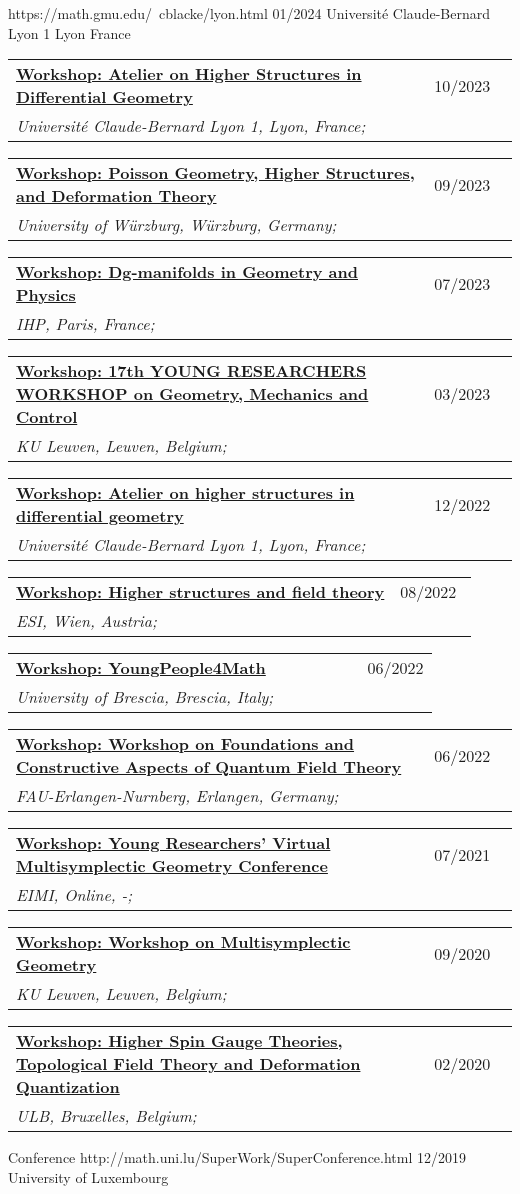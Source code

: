 \documentclass[a4paper]{article}
\newcommand{\longvoice}[8]{
	\begin{tabular}{p{0.83\linewidth} p{0.17\linewidth} }
		\textbf{\href{#3}{#2: #1}} & #4 
		\\ 
		\textit{#5, #6, #7;} & {\small\emph{#8}}
	\end{tabular}
	\vspace{.5em}
}
\begin{document}
		{https://math.gmu.edu/~cblacke/lyon.html}
		{01/2024}
		{Université Claude-Bernard Lyon 1}
		{Lyon}
		{France}
		{}
	\longvoice{Atelier on Higher Structures in Differential Geometry}
		{Workshop}
		{https://ryvkin.eu/hs2023/index.html}
		{10/2023}
		{Université Claude-Bernard Lyon 1}
		{Lyon}
		{France}
		{}
	\longvoice{Poisson Geometry, Higher Structures, and Deformation Theory}
		{Workshop}
		{https://www.mathematik.uni-wuerzburg.de/mathematicalphysics/forschung/veranstaltungen/workshops-und-konferenzen/single/news/poisson-geometry-higher-structures-and-deformation-theory/}
		{09/2023}
		{University of Würzburg}
		{Würzburg}
		{Germany}
		{}
	\longvoice{Dg-manifolds in Geometry and Physics}
		{Workshop}
		{https://indico.math.cnrs.fr/event/7885/}
		{07/2023}
		{IHP}
		{Paris}
		{France}
		{}
	\longvoice{17th YOUNG RESEARCHERS WORKSHOP on Geometry, Mechanics and Control}
		{Workshop}
		{https://wis.kuleuven.be/events/young-researchers-workshop2023/young-researchers-workshop2023}
		{03/2023}
		{KU Leuven}
		{Leuven}
		{Belgium}
		{}
	\longvoice{Atelier on higher structures in differential geometry}
		{Workshop}
		{https://ryvkin.eu/atelier2022/}
		{12/2022}
		{Université Claude-Bernard Lyon 1}
		{Lyon}
		{France}
		{}
	\longvoice{Higher structures and field theory}
		{Workshop}
		{https://www.esi.ac.at/events/e430/}
		{08/2022}
		{ESI}
		{Wien}
		{Austria}
		{}
	\longvoice{YoungPeople4Math}
		{Workshop}
		{https://www.dropbox.com/s/2elzcczx7m0o9zf/2206-Brescia-YoungPeople4Math.pdf?dl=0}
		{06/2022}
		{University of Brescia}
		{Brescia}
		{Italy}
		{}
	\longvoice{Workshop on Foundations and Constructive Aspects of Quantum Field Theory}
		{Workshop}
		{https://en.www.math.fau.de/mathematical-physics/gandalf-lechner/events10056/workshop-lqp46/}
		{06/2022}
		{FAU-Erlangen-Nurnberg}
		{Erlangen}
		{Germany}
		{}
	\longvoice{Young Researchers' Virtual Multisymplectic Geometry Conference}
		{Workshop}
		{https://public.eimi.ru/~cblacker/yrvmgc_21.html}
		{07/2021}
		{EIMI}
		{Online}
		{-}
		{}
	\longvoice{Workshop on Multisymplectic Geometry}
		{Workshop}
		{https://wis.kuleuven.be/events/archive/multisymplectic}
		{09/2020}
		{KU Leuven}
		{Leuven}
		{Belgium}
		{}
	\longvoice{Higher Spin Gauge Theories, Topological Field Theory and Deformation Quantization}
		{Workshop}
		{http://www.solvayinstitutes.be/event/workshop/higher_spin_2020/higher_spin_2020.html}
		{02/2020}
		{ULB}
		{Bruxelles}
		{Belgium}
		{}
		{Conference}
		{http://math.uni.lu/SuperWork/SuperConference.html}
		{12/2019}
		{University of Luxembourg}
\end{document}
